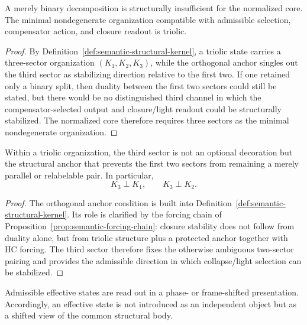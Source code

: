 \begin{lemma}
\label{lem:triolic-minimality-lemma}
A merely binary decomposition is structurally insufficient for the normalized
core. The minimal nondegenerate organization compatible with admissible
selection, compensator action, and closure readout is triolic.
\end{lemma}

\begin{proof}
By Definition~\ref{def:semantic-structural-kernel}, a triolic state carries a
three-sector organization $(K_1,K_2,K_3)$, while the orthogonal anchor singles
out the third sector as stabilizing direction relative to the first two. If one
retained only a binary split, then duality between the first two sectors could
still be stated, but there would be no distinguished third channel in which the
compensator-selected output and closure/light readout could be structurally
stabilized. The normalized core therefore requires three sectors as the minimal
nondegenerate organization.
\end{proof}

\begin{lemma}
\label{lem:orthogonal-anchor-lemma}
Within a triolic organization, the third sector is not an optional decoration but
the structural anchor that prevents the first two sectors from remaining a
merely parallel or relabelable pair. In particular,
\[
K_3\perp K_1,
\qquad
K_3\perp K_2.
\]
\end{lemma}

\begin{proof}
The orthogonal anchor condition is built into
Definition~\ref{def:semantic-structural-kernel}. Its role is clarified by the
forcing chain of Proposition~\ref{prop:semantic-forcing-chain}: closure
stability does not follow from duality alone, but from triolic structure plus a
protected anchor together with HC forcing. The third sector therefore fixes the
otherwise ambiguous two-sector pairing and provides the admissible direction in
which collapse/light selection can be stabilized.
\end{proof}

\begin{lemma}
\label{lem:frame-shift-lemma}
Admissible effective states are read out in a phase- or frame-shifted
presentation. Accordingly, an effective state is not introduced as an
independent object but as a shifted view of the common structural body.
\end{lemma}

